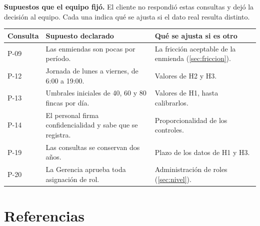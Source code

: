 \documentclass[11pt,letterpaper]{article}
\newcommand{\cab}[1]{\textbf{\rmfamily #1}}
\begin{document}
\textbf{Supuestos que el equipo fijó.} El cliente no respondió estas consultas y dejó la decisión al
equipo. Cada una indica qué se ajusta si el dato real resulta distinto.

\begin{center}
\small
\renewcommand{\arraystretch}{1.22}
\begin{tabularx}{\textwidth}{@{}L{1.2cm} L{7.2cm} Y@{}}
\toprule
\cab{Consulta} & \cab{Supuesto declarado} & \cab{Qué se ajusta si es otro} \\
\midrule
P-09 & Las enmiendas son pocas por período. & La fricción aceptable de la enmienda (\ref{sec:friccion}). \\
P-12 & Jornada de lunes a viernes, de 6:00 a 19:00. & Valores de H2 y H3. \\
P-13 & Umbrales iniciales de 40, 60 y 80 fincas por día. & Valores de H1, hasta calibrarlos. \\
P-14 & El personal firma confidencialidad y sabe que se registra. & Proporcionalidad de los controles. \\
P-19 & Las consultas se conservan dos años. & Plazo de los datos de H1 y H3. \\
P-20 & La Gerencia aprueba toda asignación de rol. & Administración de roles (\ref{sec:nivel}). \\
\bottomrule
\end{tabularx}
\end{center}

\section*{Referencias}
\end{document}
